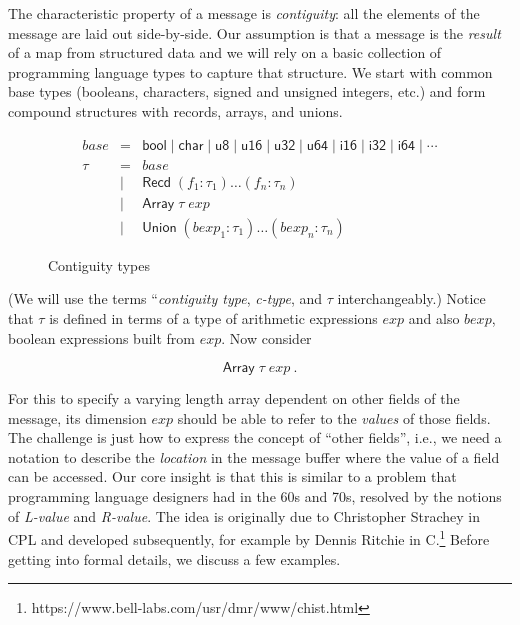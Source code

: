\documentclass[svgnames]{llncs}
\newcommand{\ie}{i.e.}
\newcommand{\etc}{etc.}
\newcommand{\konst}[1]{\ensuremath{\mathsf{#1}}}
\begin{document}
The characteristic property of a message is \emph{contiguity}: all the
elements of the message are laid out side-by-side. Our assumption is
that a message is the \emph{result} of a map from structured data and
we will rely on a basic collection of programming language types to
capture that structure. We start with common base types (booleans,
characters, signed and unsigned integers, \etc) and form compound
structures with records, arrays, and unions.

\begin{figure}
\[
\begin{array}{rcl}
 \mathit{base} & = & \konst{bool} \mid \konst{char} \mid \konst{u8} \mid
 \konst{u16} \mid \konst{u32} \mid \konst{u64}  \mid \konst{i16} \mid
 \konst{i32} \mid \konst{i64} \mid \cdots \\
 \tau & = & \mathit{base} \\
      & \mid & \konst{Recd}\; (f_1 : \tau_1) \ldots (f_n : \tau_n) \\
      & \mid & \konst{Array}\; \tau \; \mathit{exp} \\
      & \mid & \konst{Union}\; (\mathit{bexp}_1 : \tau_1) \ldots (\mathit{bexp}_n : \tau_n)
\end{array}
\]
\label{contig-types}
\caption{Contiguity types}
\end{figure}

(We will use the terms ``\emph{contiguity type}, \emph{c-type}, and $\tau$
interchangeably.) Notice that $\tau$ is defined in terms of a type of
arithmetic expressions $\mathit{exp}$ and also $\mathit{bexp}$,
boolean expressions built from $\mathit{exp}$. Now consider

\[
 \konst{Array} \; \tau \; \mathit{exp} \ .
\]

\noindent For this to specify a varying length array dependent on
other fields of the message, its dimension $\mathit{exp}$ should be
able to refer to the \emph{values} of those fields. The challenge is
just how to express the concept of ``other fields'', \ie, we need a
notation to describe the \emph{location} in the message buffer where
the value of a field can be accessed. Our core insight is that this is
similar to a problem that programming language designers had in the
60s and 70s, resolved by the notions of \emph{L-value} and
\emph{R-value}. The idea is originally due to Christopher Strachey in
CPL and developed subsequently, for example by Dennis Ritchie in
C.\footnote{https://www.bell-labs.com/usr/dmr/www/chist.html} Before
getting into formal details, we discuss a few examples.
\end{document}
